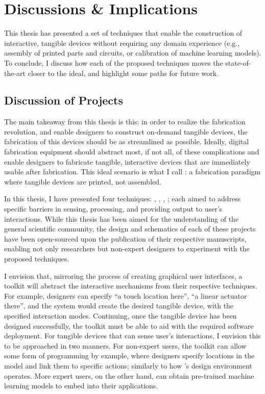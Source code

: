 \chapter{Discussions \& Implications} \label{ch:discussion}
  This thesis has presented a set of techniques that enable the construction of
  interactive, tangible devices without requiring any domain experience (e.g.,
  assembly of printed parts and circuits, or calibration of machine learning
  models). To conclude, I discuss how each of the proposed techniques moves
  the state-of-the-art closer to the \papf ideal, and highlight some paths for
  future work.

  \section{Discussion of Projects}
    The main takeaway from this thesis is this: in order to realize the
    fabrication revolution, and enable designers to construct on-demand tangible
    devices, the fabrication of this devices should be as streamlined as
    possible. Ideally, digital fabrication equipment should abstract most, if
    not all, of these complications and enable designers to fabricate tangible,
    interactive devices that are immediately usable after fabrication. This
    ideal scenario is what I call \emph{\papf}: a fabrication paradigm where
    tangible devices are printed, not assembled.

    In this thesis, I have presented four \pap techniques: \al, \bh, \al,
    \mp; each aimed to address specific barriers in sensing, processing, and
    providing output to user's interactions. While this thesis has been aimed
    for the understanding of the general scientific community, the design and
    schematics of each of these projects have been open-sourced upon the
    publication of their respective manuscripts, enabling not only researchers
    but non-expert designers to experiment with the proposed techniques.

    I envision that, mirroring the process of creating graphical user
    interfaces, a \papf toolkit will abstract the interactive mechanisms from
    their respective techniques. For example, designers can specify ``a touch
    location here'', ``a linear actuator there'', and the system would create
    the desired tangible device, with the specified interaction modes.
    Continuing, once the tangible device has been designed successfully, the
    toolkit must be able to aid with the required software deployment. For
    tangible devices that can sense user's interactions, I envision this to be
    approached in two manners. For non-expert users, the \papf toolkit can
    allow some form of programming by example, where designers specify locations
    in the model and link them to specific actions; similarly to how \bh's
    design environment operates. More expert users, on the other hand, can
    obtain pre-trained machine learning models to embed into their applications.

